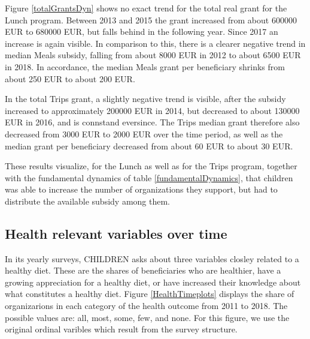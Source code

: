 \documentclass[12pt, a4paper, titlepage]{article}\usepackage[]{graphicx}\usepackage[]{color}
\begin{document}
Figure \ref{totalGrantsDyn} shows no exact trend for the total real grant for the Lunch program. Between 2013 and 2015 the grant increased from about 600000 EUR to 680000 EUR, but falls behind in the following year. Since 2017 an increase is again visible. In comparison to this, there is a clearer negative trend in median Meals subsidy, falling from about 8000 EUR in 2012 to about 6500 EUR in 2018. In accordance, the median Meals grant per beneficiary shrinks from about 250 EUR to about 200 EUR. 

In the total Trips grant, a slightly negative trend is visible, after the subsidy increased to approximately 200000 EUR in 2014, but decreased to about 130000 EUR in 2016, and is connstand eversince. The Trips median grant therefore also decreased from 3000 EUR to 2000 EUR over the time period, as well as the median grant per beneficiary decreased from about 60 EUR to about 30 EUR.

These results visualize, for the Lunch as well as for the Trips program, together with the fundamental dynamics of table \ref{fundamentalDynamics}, that children was able to increase the number of organizations they support, but had to distribute the available subsidy among them. 

\subsection{Health relevant variables over time} 

In its yearly surveys, CHILDREN asks about three variables closley related to a healthy diet. These are the shares of beneficiaries who are healthier, have a growing appreciation for a healthy diet, or have increased their knowledge about what constitutes a healthy diet. Figure \ref{HealthTimeplots} displays the share of organizarions in each category of the health outcome from 2011 to 2018. The possible values are: all, most, some, few, and none. For this figure, we use the original ordinal varibles which result from the survey structure.  
\end{document}
